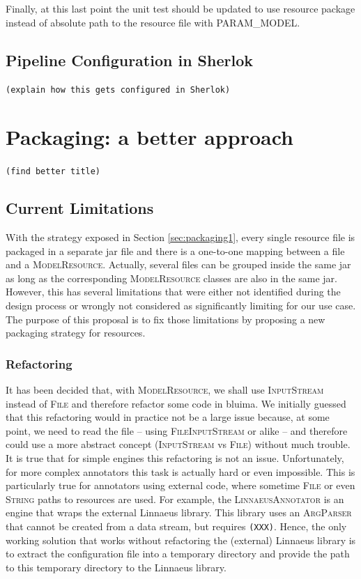 \documentclass{article}
\newcommand{\ID}[1]{\mbox{\textsc{#1}}}
\newcommand{\TODO}[1]{\texttt{\textcolor{YellowOrange}{(#1)}}} %
\begin{document}
Finally, at this last point the unit test should be updated to use resource package instead of
absolute path to the resource file with \ID{PARAM\_MODEL}.

\subsection{Pipeline Configuration in Sherlok}

\TODO{explain how this gets configured in Sherlok}

\section{Packaging: a better approach}
\label{sec:packaging2}

\TODO{find better title}

\subsection{Current Limitations}

With the strategy exposed in Section \ref{sec:packaging1}, every single resource file is packaged in a separate jar file and there is a one-to-one mapping between a file and a \ID{ModelResource}. Actually, several files can be grouped inside the same jar as long as the corresponding \ID{ModelResource} classes are also in the same jar. However, this has several limitations that were either not identified during the design process or wrongly not considered as significantly limiting for our use case. The purpose of this proposal is to fix those limitations by proposing a new packaging strategy for resources.

\subsubsection{Refactoring}

It has been decided that, with \ID{ModelResource}, we shall use \ID{InputStream} instead of
\ID{File} and therefore refactor some code in bluima. We initially guessed that this refactoring
would in practice not be a large issue because, at some point, we need to read the file -- using
\ID{FileInputStream} or alike -- and therefore could use a more abstract concept (\ID{InputStream}
vs \ID{File}) without much trouble. It is true that for simple engines this refactoring is not an
issue. Unfortunately, for more complex annotators this task is actually hard or even impossible.
This is particularly true for annotators using external code, where sometime \ID{File} or even
\ID{String} paths to resources are used. For example, the \ID{LinnaeusAnnotator} is an engine that wraps the external Linnaeus library. This library uses an \ID{ArgParser} that cannot be created from a data stream, but requires \TODO{XXX}. Hence, the only working solution that works without refactoring the (external) Linnaeus library is to extract the configuration file into a temporary directory and provide the path to this temporary directory to the Linnaeus library.
\end{document}
